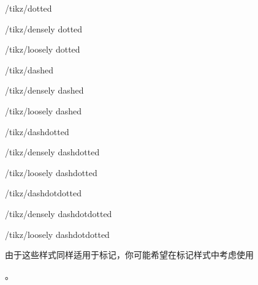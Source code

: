 \begin{stylekey}{/tikz/dotted}
\end{stylekey}

\begin{stylekey}{/tikz/densely dotted}
\end{stylekey}

\begin{stylekey}{/tikz/loosely dotted}
\end{stylekey}

\begin{stylekey}{/tikz/dashed}
\end{stylekey}

\begin{stylekey}{/tikz/densely dashed}
\end{stylekey}

\begin{stylekey}{/tikz/loosely dashed}
\end{stylekey}

\begin{stylekey}{/tikz/dashdotted}
\end{stylekey}

\begin{stylekey}{/tikz/densely dashdotted}
\end{stylekey}

\begin{stylekey}{/tikz/loosely dashdotted}
\end{stylekey}

\begin{stylekey}{/tikz/dashdotdotted}
\end{stylekey}

\begin{stylekey}{/tikz/densely dashdotdotted}
\end{stylekey}

\begin{stylekey}{/tikz/loosely dashdotdotted}
\end{stylekey}
%
\noindent 由于这些样式同样适用于标记，你可能希望在标记样式中考虑使用
%
\begin{codeexample}
\end{codeexample}
%
\noindent 。

